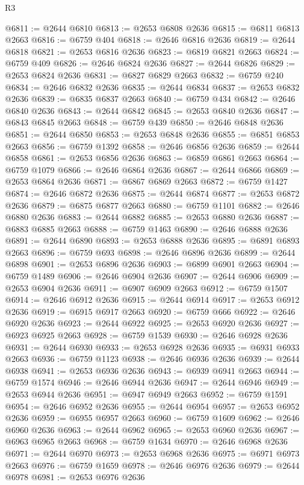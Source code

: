 \begin{lexlean}{R3}
\begin{coremodule}
@6811 := @2644 @6810
@6813 := @2653 @6808 @2636
@6815 := @6811 @6813 @2663
@6816 := @6759 @404
@6818 := @2646 @6816 @2636
@6819 := @2644 @6818
@6821 := @2653 @6816 @2636
@6823 := @6819 @6821 @2663
@6824 := @6759 @409
@6826 := @2646 @6824 @2636
@6827 := @2644 @6826
@6829 := @2653 @6824 @2636
@6831 := @6827 @6829 @2663
@6832 := @6759 @240
@6834 := @2646 @6832 @2636
@6835 := @2644 @6834
@6837 := @2653 @6832 @2636
@6839 := @6835 @6837 @2663
@6840 := @6759 @434
@6842 := @2646 @6840 @2636
@6843 := @2644 @6842
@6845 := @2653 @6840 @2636
@6847 := @6843 @6845 @2663
@6848 := @6759 @439
@6850 := @2646 @6848 @2636
@6851 := @2644 @6850
@6853 := @2653 @6848 @2636
@6855 := @6851 @6853 @2663
@6856 := @6759 @1392
@6858 := @2646 @6856 @2636
@6859 := @2644 @6858
@6861 := @2653 @6856 @2636
@6863 := @6859 @6861 @2663
@6864 := @6759 @1079
@6866 := @2646 @6864 @2636
@6867 := @2644 @6866
@6869 := @2653 @6864 @2636
@6871 := @6867 @6869 @2663
@6872 := @6759 @1427
@6874 := @2646 @6872 @2636
@6875 := @2644 @6874
@6877 := @2653 @6872 @2636
@6879 := @6875 @6877 @2663
@6880 := @6759 @1101
@6882 := @2646 @6880 @2636
@6883 := @2644 @6882
@6885 := @2653 @6880 @2636
@6887 := @6883 @6885 @2663
@6888 := @6759 @1463
@6890 := @2646 @6888 @2636
@6891 := @2644 @6890
@6893 := @2653 @6888 @2636
@6895 := @6891 @6893 @2663
@6896 := @6759 @693
@6898 := @2646 @6896 @2636
@6899 := @2644 @6898
@6901 := @2653 @6896 @2636
@6903 := @6899 @6901 @2663
@6904 := @6759 @1489
@6906 := @2646 @6904 @2636
@6907 := @2644 @6906
@6909 := @2653 @6904 @2636
@6911 := @6907 @6909 @2663
@6912 := @6759 @1507
@6914 := @2646 @6912 @2636
@6915 := @2644 @6914
@6917 := @2653 @6912 @2636
@6919 := @6915 @6917 @2663
@6920 := @6759 @666
@6922 := @2646 @6920 @2636
@6923 := @2644 @6922
@6925 := @2653 @6920 @2636
@6927 := @6923 @6925 @2663
@6928 := @6759 @1539
@6930 := @2646 @6928 @2636
@6931 := @2644 @6930
@6933 := @2653 @6928 @2636
@6935 := @6931 @6933 @2663
@6936 := @6759 @1123
@6938 := @2646 @6936 @2636
@6939 := @2644 @6938
@6941 := @2653 @6936 @2636
@6943 := @6939 @6941 @2663
@6944 := @6759 @1574
@6946 := @2646 @6944 @2636
@6947 := @2644 @6946
@6949 := @2653 @6944 @2636
@6951 := @6947 @6949 @2663
@6952 := @6759 @1591
@6954 := @2646 @6952 @2636
@6955 := @2644 @6954
@6957 := @2653 @6952 @2636
@6959 := @6955 @6957 @2663
@6960 := @6759 @1609
@6962 := @2646 @6960 @2636
@6963 := @2644 @6962
@6965 := @2653 @6960 @2636
@6967 := @6963 @6965 @2663
@6968 := @6759 @1634
@6970 := @2646 @6968 @2636
@6971 := @2644 @6970
@6973 := @2653 @6968 @2636
@6975 := @6971 @6973 @2663
@6976 := @6759 @1659
@6978 := @2646 @6976 @2636
@6979 := @2644 @6978
@6981 := @2653 @6976 @2636

\end{coremodule}
\end{lexlean}
